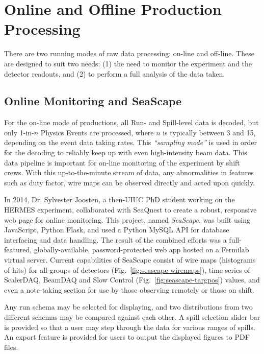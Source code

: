 
\section{Online and Offline Production Processing}

There are two running modes of raw data processing: on-line and off-line. These are designed to suit two needs: (1) the need to monitor the experiment and the detector readouts, and (2) to perform a full analysis of the data taken.

\subsection{Online Monitoring and SeaScape}

For the on-line mode of productions, all Run- and Spill-level data is decoded, but only 1-in-$n$ Physics Events are processed, where $n$ is typically between 3 and 15, depending on the event data taking rates. This \emph{``sampling mode''} is used in order for the decoding to reliably keep up with even high-intensity beam data. This data pipeline is important for on-line monitoring of the experiment by shift crews. With this up-to-the-minute stream of data, any abnormalities in features such as duty factor, wire maps can be observed directly and acted upon quickly.

In 2014, Dr. Sylvester Joosten, a then-UIUC PhD student working on the HERMES experiment, collaborated with SeaQuest to create a robust, responsive web page for online monitoring. This project, named \emph{SeaScape}, was built using JavaScript, Python Flask, and used a Python MySQL API for database interfacing and data handling. The result of the combined efforts was a full-featured, globally-available, password-protected web app hosted on a Fermilab virtual server. Current capabilities of SeaScape consist of wire maps (histograms of hits) for all groups of detectors (Fig.~\ref{fig:seascape-wiremaps}), time series of ScalerDAQ, BeamDAQ and Slow Control (Fig.~\ref{fig:seascape-targpos}) values, and even a note-taking section for use by those observing remotely or those on shift. 

Any run schema may be selected for displaying, and two distributions from two different schemas may be compared against each other. A spill selection slider bar is provided so that a user may step through the data for various ranges of spills. An export feature is provided for users to output the displayed figures to PDF files.

